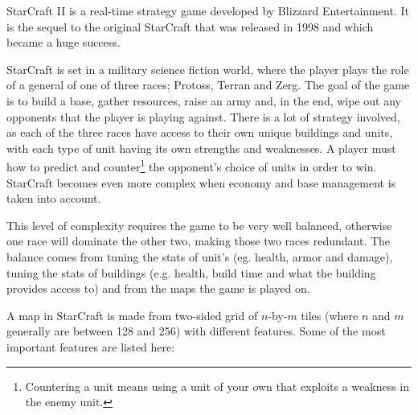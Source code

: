 StarCraft II\cite{starcraft2} is a real-time strategy game developed by Blizzard Entertainment. It is the sequel to the original StarCraft\cite{starcraft} that was released in 1998 and which became a huge success.

StarCraft is set in a military science fiction world, where the player plays the role of a general of one of three races; Protoss, Terran and Zerg. The goal of the game is to build a base, gather resources, raise an army and, in the end, wipe out any opponents that the player is playing against. There is a lot of strategy involved, as each of the three races have access to their own unique buildings and units, with each type of unit having its own strengths and weaknesses. A player must how to predict and counter\footnote{Countering a unit means using a unit of your own that exploits a weakness in the enemy unit.} the opponent's choice of units in order to win. StarCraft becomes even more complex when economy and base management is taken into account.


This level of complexity requires the game to be very well balanced, otherwise one race will dominate the other two, making those two races redundant. The balance comes from tuning the stats of unit's (eg. health, armor and damage), tuning the stats of buildings (e.g. health, build time and what the building provides access to) and from the maps the game is played on.

A map in StarCraft is made from two-sided grid of $n$-by-$m$ tiles (where $n$ and $m$ generally are between 128 and 256) with different features. Some of the most important features are listed here:

